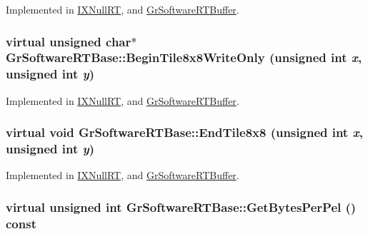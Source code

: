 Implemented in \hyperlink{class_i_x_null_r_t_ea6bb9f8e61bf8a53deab237d6c93fd2}{IXNullRT}, and \hyperlink{class_gr_software_r_t_buffer_cd1d8af57e8676b94e5e1e5c21fbb4db}{GrSoftwareRTBuffer}.\hypertarget{class_gr_software_r_t_base_8105b579f48de033a1f78c98b843d3e9}{
\subsubsection[{BeginTile8x8WriteOnly}]{\setlength{\rightskip}{0pt plus 5cm}virtual unsigned char$\ast$ GrSoftwareRTBase::BeginTile8x8WriteOnly (unsigned int {\em x}, \/  unsigned int {\em y})}}
\label{class_gr_software_r_t_base_8105b579f48de033a1f78c98b843d3e9}




Implemented in \hyperlink{class_i_x_null_r_t_2bf9c2cf6c9e67cd29739456f1bc4e11}{IXNullRT}, and \hyperlink{class_gr_software_r_t_buffer_f796e2b365ca4712537be3a927e565c6}{GrSoftwareRTBuffer}.\hypertarget{class_gr_software_r_t_base_152b9d2964518f0c50ff8ced3f3da097}{
\subsubsection[{EndTile8x8}]{\setlength{\rightskip}{0pt plus 5cm}virtual void GrSoftwareRTBase::EndTile8x8 (unsigned int {\em x}, \/  unsigned int {\em y})}}
\label{class_gr_software_r_t_base_152b9d2964518f0c50ff8ced3f3da097}




Implemented in \hyperlink{class_i_x_null_r_t_483a293eb0878d94101cf84ba12632cd}{IXNullRT}, and \hyperlink{class_gr_software_r_t_buffer_2e3662e5945e1f6df74f620f5b3b9b0f}{GrSoftwareRTBuffer}.\hypertarget{class_gr_software_r_t_base_24d6fc1742e612d9fa304e2264bd9dd8}{
\subsubsection[{GetBytesPerPel}]{\setlength{\rightskip}{0pt plus 5cm}virtual unsigned int GrSoftwareRTBase::GetBytesPerPel () const}}
\label{class_gr_software_r_t_base_24d6fc1742e612d9fa304e2264bd9dd8}




